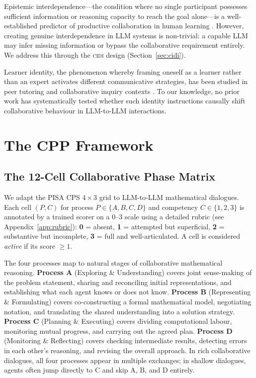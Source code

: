 \documentclass{article}
\newcommand{\CIDI}{\textsc{cidi}}
\begin{document}
Epistemic interdependence---the condition where no single participant
possesses sufficient information or reasoning capacity to reach the
goal alone---is a well-established predictor of productive
collaboration in human learning \citep{barron2003conditions,
johnson2009cooperative}. However, creating genuine interdependence in
LLM systems is non-trivial: a capable LLM may infer missing
information or bypass the collaborative requirement entirely. We
address this through the \CIDI{} design (Section~\ref{sec:cidi}).

Learner identity, the phenomenon whereby framing oneself as a learner
rather than an expert activates different communicative strategies, has
been studied in peer tutoring \citep{chi2001learning} and collaborative
inquiry contexts \citep{king1992facilitating}. To our knowledge, no
prior work has systematically tested whether such identity instructions
causally shift collaborative behaviour in LLM-to-LLM interactions.

\section{The CPP Framework}
\label{sec:framework}

\subsection{The 12-Cell Collaborative Phase Matrix}

We adapt the PISA CPS $4 \times 3$ grid to LLM-to-LLM mathematical
dialogues. Each cell $(P, C)$ for process $P \in \{A, B, C, D\}$ and
competency $C \in \{1, 2, 3\}$ is annotated by a trained scorer on a
0--3 scale using a detailed rubric (see Appendix~\ref{app:rubric}):
\textbf{0} = absent, \textbf{1} = attempted but superficial,
\textbf{2} = substantive but incomplete, \textbf{3} = full and
well-articulated. A cell is considered \emph{active} if its score
$\geq 1$.

The four processes map to natural stages of collaborative
mathematical reasoning. \textbf{Process A} (Exploring \&
Understanding) covers joint sense-making of the problem statement,
sharing and reconciling initial representations, and establishing what
each agent knows or does not know. \textbf{Process B} (Representing
\& Formulating) covers co-constructing a formal mathematical model,
negotiating notation, and translating the shared understanding into a
solution strategy. \textbf{Process C} (Planning \& Executing) covers
dividing computational labour, monitoring mutual progress, and carrying
out the agreed plan. \textbf{Process D} (Monitoring \& Reflecting)
covers checking intermediate results, detecting errors in each other's
reasoning, and revising the overall approach. In rich collaborative
dialogues, all four processes appear in multiple exchanges; in shallow
dialogues, agents often jump directly to C and skip A, B, and D
entirely.
\end{document}
